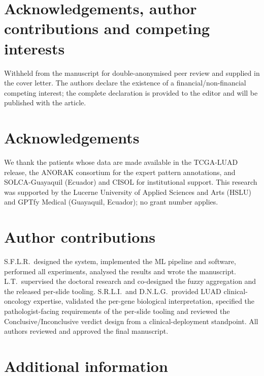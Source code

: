 
\ifanon
\section*{Acknowledgements, author contributions and competing interests}
Withheld from the manuscript for double-anonymised peer review and
supplied in the cover letter. The authors declare the existence of a
financial/non-financial competing interest; the complete declaration is
provided to the editor and will be published with the article.
\else
\section*{Acknowledgements}
We thank the patients whose data are made available in the TCGA-LUAD
release, the ANORAK consortium for the expert pattern annotations,
and SOLCA-Guayaquil (Ecuador) and CISOL for institutional support.
This research was supported by the Lucerne University of Applied
Sciences and Arts (HSLU) and GPTfy Medical (Guayaquil, Ecuador); no
grant number applies.

\section*{Author contributions}
S.F.L.R.\ designed the system, implemented the ML pipeline
and \lchai{} software, performed all experiments, analysed the
results and wrote the manuscript.
L.T.\ supervised the doctoral research and co-designed the
fuzzy aggregation and the released per-slide tooling.
S.R.L.I.\ and D.N.L.G.\ provided LUAD
clinical-oncology expertise, validated the per-gene biological
interpretation, specified the pathologist-facing requirements of the
per-slide tooling and reviewed the Conclusive/Inconclusive verdict
design from a clinical-deployment standpoint.
All authors reviewed and approved the final manuscript.

\section*{Additional information}
